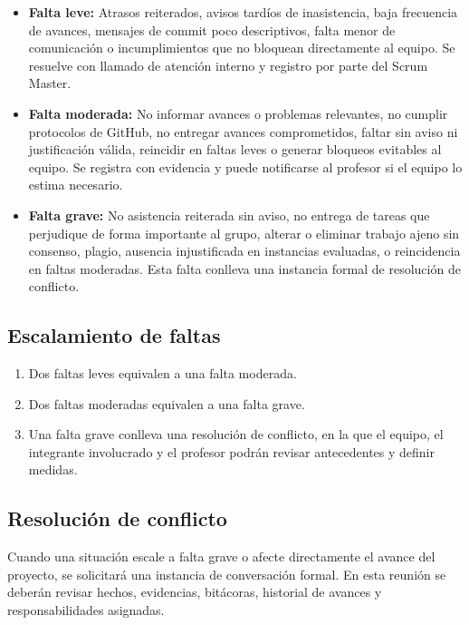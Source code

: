 \documentclass[12pt,a4paper]{article}
\begin{document}
\begin{itemize}
    \item \textbf{Falta leve:} Atrasos reiterados, avisos tardíos de inasistencia, baja frecuencia de avances, mensajes de commit poco descriptivos, falta menor de comunicación o incumplimientos que no bloquean directamente al equipo. Se resuelve con llamado de atención interno y registro por parte del Scrum Master.

    \item \textbf{Falta moderada:} No informar avances o problemas relevantes, no cumplir protocolos de GitHub, no entregar avances comprometidos, faltar sin aviso ni justificación válida, reincidir en faltas leves o generar bloqueos evitables al equipo. Se registra con evidencia y puede notificarse al profesor si el equipo lo estima necesario.

    \item \textbf{Falta grave:} No asistencia reiterada sin aviso, no entrega de tareas que perjudique de forma importante al grupo, alterar o eliminar trabajo ajeno sin consenso, plagio, ausencia injustificada en instancias evaluadas, o reincidencia en faltas moderadas. Esta falta conlleva una instancia formal de resolución de conflicto.
\end{itemize}

\subsection{Escalamiento de faltas}

\begin{enumerate}
    \item Dos faltas leves equivalen a una falta moderada.
    \item Dos faltas moderadas equivalen a una falta grave.
    \item Una falta grave conlleva una resolución de conflicto, en la que el equipo, el integrante involucrado y el profesor podrán revisar antecedentes y definir medidas.
\end{enumerate}

\subsection{Resolución de conflicto}

Cuando una situación escale a falta grave o afecte directamente el avance del proyecto, se solicitará una instancia de conversación formal. En esta reunión se deberán revisar hechos, evidencias, bitácoras, historial de avances y responsabilidades asignadas.
\end{document}
